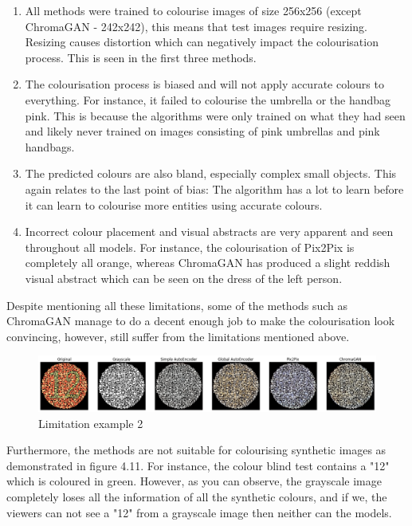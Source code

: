 \begin{enumerate}
  \item All methods were trained to colourise images of size 256x256 (except ChromaGAN - 242x242), this means that test images require resizing. Resizing causes distortion which can negatively impact the colourisation process. This is seen in the first three methods.
  \item The colourisation process is biased and will not apply accurate colours to everything. For instance, it failed to colourise the umbrella or the handbag pink. This is because the algorithms were only trained on what they had seen and likely never trained on images consisting of pink umbrellas and pink handbags. 
  \item The predicted colours are also bland, especially complex small objects. This again relates to the last point of bias: The algorithm has a lot to learn before it can learn to colourise more entities using accurate colours.
  \item Incorrect colour placement and visual abstracts are very apparent and seen throughout all models. For instance, the colourisation of Pix2Pix is completely all orange, whereas ChromaGAN has produced a slight reddish visual abstract which can be seen on the dress of the left person. 

\end{enumerate}
Despite mentioning all these limitations, some of the methods such as ChromaGAN manage to do a decent enough job to make the colourisation look convincing, however, still suffer from the limitations mentioned above.




\begin{figure}[H]
    \centering
    \includegraphics[width=1\columnwidth]{sections/figures/limitation2.png}
    \caption{Limitation example 2}
    \label{fig:my_label}
\end{figure}
Furthermore, the methods are not suitable for colourising synthetic images as demonstrated in figure 4.11. For instance, the colour blind test contains a "12" which is coloured in green. However, as you can observe, the grayscale image completely loses all the information of all the synthetic colours, and if we, the viewers can not see a "12" from a grayscale image then neither can the models. 


